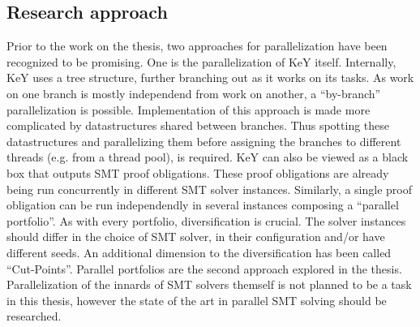 \documentclass{scrartcl}
\begin{document}
\subsection{Research approach}
Prior to the work on the thesis,
two approaches for parallelization have been recognized to be promising.
One is the parallelization of KeY itself.
Internally, KeY uses a tree structure, further branching out as it works on its tasks.
As work on one branch is mostly independend from work on another,
a \enquote{by-branch} parallelization is possible.
Implementation of this approach is made more complicated
by datastructures shared between branches.
Thus spotting these datastructures and parallelizing them
before assigning the branches to different threads (e.g. from a thread pool),
is required.
KeY can also be viewed as a black box that outputs SMT proof obligations.
These proof obligations are already being run concurrently in different SMT solver instances.
Similarly, a single proof obligation can be run independendly in several instances
composing a \enquote{parallel portfolio}.
As with every portfolio, diversification is crucial.
The solver instances should differ in the choice of SMT solver,
in their configuration and/or have different seeds.
An additional dimension to the diversification has been called \enquote{Cut-Points}.
Parallel portfolios are the second approach explored in the thesis.
Parallelization of the innards of SMT solvers themself is not planned to be a task in this thesis,
however the state of the art in parallel SMT solving should be researched.
\end{document}
